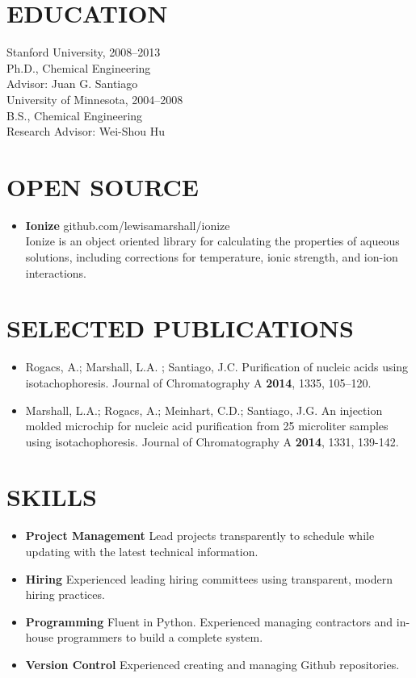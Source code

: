 \documentclass{res}
\begin{document}
\begin{resume}
\section{EDUCATION}
		Stanford University, 2008--2013 \\
  		Ph.D., Chemical Engineering\\
  		Advisor: Juan G. Santiago\\

		University of Minnesota, 2004--2008 \\
  		B.S., Chemical Engineering\\
      Research Advisor: Wei-Shou Hu

 \section{OPEN SOURCE}
   \begin{itemize}
     \item \textbf{Ionize} github.com/lewisamarshall/ionize\\
   Ionize is an object oriented library for calculating the properties of
   aqueous solutions, including corrections for temperature, ionic strength, and ion-ion interactions.
 \end{itemize}

 \section{SELECTED PUBLICATIONS}
  \begin{itemize}
  \item Rogacs, A.; Marshall, L.A. ; Santiago, J.C. Purification of nucleic acids using isotachophoresis. Journal of Chromatography A \textbf{2014}, 1335, 105–120.
  \item Marshall, L.A.; Rogacs, A.; Meinhart, C.D.; Santiago, J.G. An injection molded microchip for nucleic acid purification from 25 microliter samples using isotachophoresis. Journal of Chromatography A \textbf{2014}, 1331, 139-142.
\end{itemize}

 \section{SKILLS}
   \begin{itemize}
     \item \textbf{Project Management}	Lead projects transparently to schedule while updating with the latest technical information.
     \item \textbf{Hiring}	Experienced leading hiring committees using transparent, modern hiring practices.
     \item \textbf{Programming}	Fluent in Python. Experienced managing contractors and in-house programmers to build a complete system.
     \item \textbf{Version Control} Experienced creating and managing Github repositories.
   \end{itemize}



\end{resume}
\end{document}
